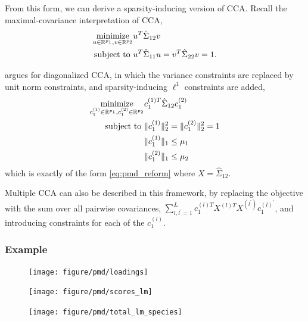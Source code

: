\documentclass[14pt]{extarticle}
\begin{document}
From this form, we can derive a sparsity-inducing version of
CCA. Recall the maximal-covariance interpretation of CCA,
\begin{align*}
  \mathop\mathrm{minimize}_{u \in \mathbb{R}^{p_{1}}, v \in \mathbb{R}^{p_{2}}} &u^{T}\hat{\Sigma}_{12}v \\
  \text{subject to } &u^{T}\hat{\Sigma}_{11} u = v^{ T}\hat{\Sigma}_{22}v = 1.
\end{align*}

\citep{witten2009penalized} argues for diagonalized CCA, in which the variance
constraints are replaced by unit norm constraints, and sparsity-inducing
$\ell^{1}$ constraints are added,
\begin{align*}
  \mathop\mathrm{minimize}_{c_{1}^{(1)} \in \mathbb{R}^{p_{1}}, c_{1}^{(2)} \in
    \mathbb{R}^{p_{2}}} & c_{1}^{(1) T}\hat{\Sigma}_{12}
  c_{1}^{(2)} \\
  \text{subject to } &\|c_{1}^{(1)}\|_{2}^{2} = \|c_{1}^{(2)}\|_{2}^{2} = 1 \\
  &\|c_{1}^{(1)}\|_{1} \leq \mu_{1} \\
  &\|c_{1}^{(2)}\|_{1} \leq \mu_{2}
\end{align*}
which is exactly of the form \ref{eq:pmd_reform} where $X =
\hat{\Sigma}_{12}$.

Multiple CCA can also be described in this framework, by replacing the objective
with the sum over all pairwise covariances, $\sum_{l, l^{\prime} = 1}^{L}
c_{1}^{(l) T}X^{(l) T}X^{(l^{\prime})}c_{1}^{(l)^{\prime}}$, and introducing
constraints for each of the $c_{1}^{(l)}$.

\subsubsection{Example}
\label{subsec:sparse_cca_example}

\begin{figure}
  \centering
  \texttt{[image: figure/pmd/loadings]}
  \caption{\label{fig:pmd_loadings} }
\end{figure}

\begin{figure}
  \centering
  \texttt{[image: figure/pmd/scores\_lm]}
  \caption{\label{fig:pmd_scores_lm} }
\end{figure}

\begin{figure}
  \centering
  \texttt{[image: figure/pmd/total\_lm\_species]}
  \caption{\label{fig:pmd_total_lm_species}}
\end{figure}
\end{document}
